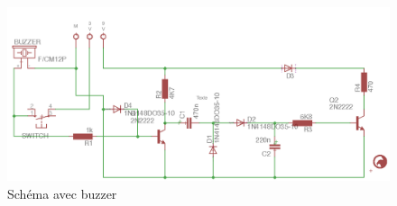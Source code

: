 \begin{figure}[H]
\centering
\includegraphics[width=1\textwidth]{ressources/schema_final}
\caption{Schéma avec buzzer}
\end{figure}








